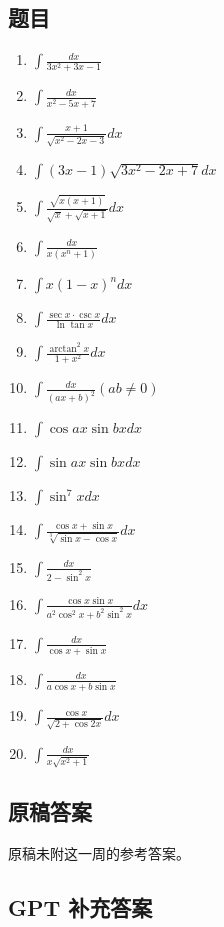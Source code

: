 \documentclass[UTF8,11pt, a4paper, oneside, fontset=none]{ctexbook}
\begin{document}
\subsection*{题目}

\begin{enumerate}
\item $\int \frac{dx}{3x^2 + 3x -1}$
\item $\int \frac{dx}{x^2 - 5x + 7}$
\item $\int \frac{x+1}{\sqrt{x^2 -2x-3}}dx$
\item $\int (3x -1) \sqrt{3x^2 - 2x + 7} dx$
\item  $\int \frac{\sqrt{x(x+1)}}{\sqrt x + \sqrt{x+1}} dx$
\item $\int \frac{dx}{x(x^n + 1)}$ 
\item $\int x(1-x)^n dx$
\item  $\int \frac{\sec x \cdot \csc x}{\ln \tan x} dx$
\item $\int \frac{\arctan^2 x}{1 + x^2}dx$
\item $\int \frac{dx}{(ax+b)^2} (ab \neq 0)$
\item $\int \cos ax \sin bx dx$
\item $\int \sin ax \sin bx dx$
\item $\int \sin^7 x dx$
\item $\int \frac{\cos x + \sin x}{\sqrt[3]{\sin x - \cos x}} dx$
\item $\int \frac{dx}{2 - \sin^2 x}$
\item $\int \frac{\cos x \sin x}{a^2 \cos^2 x + b^2 \sin^2 x}dx$
\item $\int \frac{dx}{\cos x + \sin x}$
\item $\int \frac{dx}{a \cos x + b \sin x}$
\item $\int \frac{\cos x }{\sqrt{2 + \cos 2x}}dx$
\item $\int \frac{dx}{x \sqrt{x^2 + 1}}$ 
\end{enumerate}

\clearpage

\subsection*{原稿答案}

\noindent 原稿未附这一周的参考答案。

\clearpage

\subsection*{GPT 补充答案}
\end{document}
